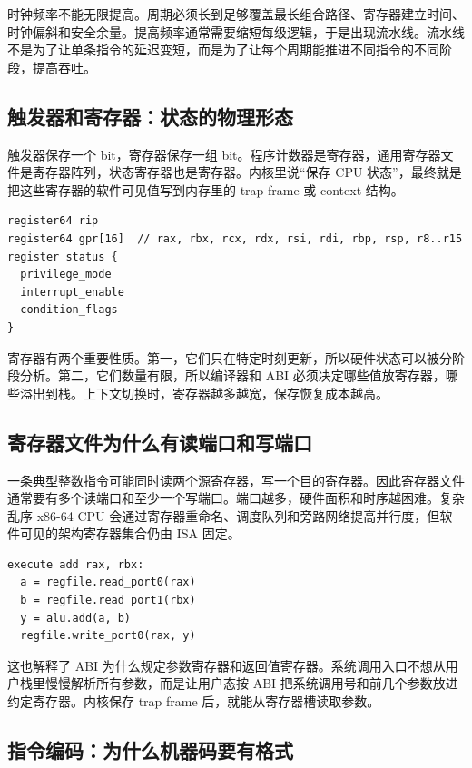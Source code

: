 时钟频率不能无限提高。周期必须长到足够覆盖最长组合路径、寄存器建立时间、时钟偏斜和安全余量。提高频率通常需要缩短每级逻辑，于是出现流水线。流水线不是为了让单条指令的延迟变短，而是为了让每个周期能推进不同指令的不同阶段，提高吞吐。

\subsection{触发器和寄存器：状态的物理形态}

触发器保存一个 bit，寄存器保存一组 bit。程序计数器是寄存器，通用寄存器文件是寄存器阵列，状态寄存器也是寄存器。内核里说“保存 CPU 状态”，最终就是把这些寄存器的软件可见值写到内存里的 trap frame 或 context 结构。

\begin{lstlisting}
register64 rip
register64 gpr[16]  // rax, rbx, rcx, rdx, rsi, rdi, rbp, rsp, r8..r15
register status {
  privilege_mode
  interrupt_enable
  condition_flags
}
\end{lstlisting}

寄存器有两个重要性质。第一，它们只在特定时刻更新，所以硬件状态可以被分阶段分析。第二，它们数量有限，所以编译器和 ABI 必须决定哪些值放寄存器，哪些溢出到栈。上下文切换时，寄存器越多越宽，保存恢复成本越高。

\subsection{寄存器文件为什么有读端口和写端口}

一条典型整数指令可能同时读两个源寄存器，写一个目的寄存器。因此寄存器文件通常要有多个读端口和至少一个写端口。端口越多，硬件面积和时序越困难。复杂乱序 x86-64 CPU 会通过寄存器重命名、调度队列和旁路网络提高并行度，但软件可见的架构寄存器集合仍由 ISA 固定。

\begin{lstlisting}
execute add rax, rbx:
  a = regfile.read_port0(rax)
  b = regfile.read_port1(rbx)
  y = alu.add(a, b)
  regfile.write_port0(rax, y)
\end{lstlisting}

这也解释了 ABI 为什么规定参数寄存器和返回值寄存器。系统调用入口不想从用户栈里慢慢解析所有参数，而是让用户态按 ABI 把系统调用号和前几个参数放进约定寄存器。内核保存 trap frame 后，就能从寄存器槽读取参数。

\subsection{指令编码：为什么机器码要有格式}

